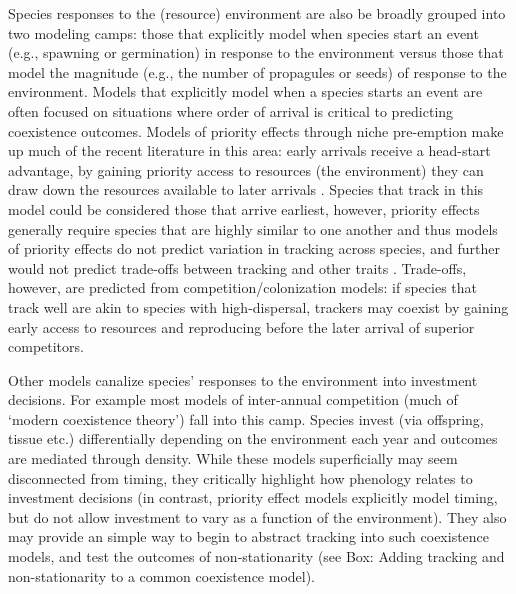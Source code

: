 \documentclass[11pt,letterpaper]{article}
\begin{document}

Species responses to the (resource) environment are also be broadly grouped into two modeling camps: those that explicitly model when species start an event (e.g., spawning or germination) in response to the environment versus those that model the magnitude (e.g., the number of propagules or seeds) of response to the environment. Models that explicitly model when a species starts an event are often focused on situations where order of arrival is critical to predicting coexistence outcomes. Models of priority effects through niche pre-emption make up much of the recent literature in this area: early arrivals receive a head-start advantage, by gaining priority access to resources (the environment) they can draw down the resources available to later arrivals \citep{fukami2015}. Species that track in this model could be considered those that arrive earliest, however, priority effects generally require species that are highly similar to one another and thus models of priority effects do not predict variation in tracking across species, and further would not predict trade-offs between tracking and other traits \citep{fukami2015}. Trade-offs, however, are predicted from competition/colonization models: if species that track well are akin to species with high-dispersal, trackers may coexist by gaining early access to resources and reproducing before the later arrival of superior competitors. 

Other models canalize species' responses to the environment into investment decisions. For example most models of inter-annual competition (much of `modern coexistence theory') fall into this camp. Species invest (via offspring, tissue etc.) differentially depending on the environment each year and outcomes are mediated through density. While these models superficially may seem disconnected from timing, they critically highlight how phenology relates to investment decisions (in contrast, priority effect models explicitly model timing, but do not allow investment to vary as a function of the environment). They also may provide an simple way to begin to abstract tracking into such coexistence models, and test the outcomes of non-stationarity (see Box: Adding tracking and non-stationarity to a common coexistence model). 
\end{document}
